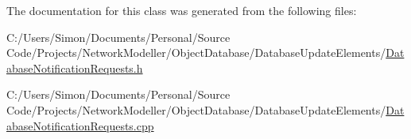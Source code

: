 The documentation for this class was generated from the following files\+:\begin{DoxyCompactItemize}
\item 
C\+:/\+Users/\+Simon/\+Documents/\+Personal/\+Source Code/\+Projects/\+Network\+Modeller/\+Object\+Database/\+Database\+Update\+Elements/\hyperlink{_database_notification_requests_8h}{Database\+Notification\+Requests.\+h}\item 
C\+:/\+Users/\+Simon/\+Documents/\+Personal/\+Source Code/\+Projects/\+Network\+Modeller/\+Object\+Database/\+Database\+Update\+Elements/\hyperlink{_database_notification_requests_8cpp}{Database\+Notification\+Requests.\+cpp}\end{DoxyCompactItemize}
